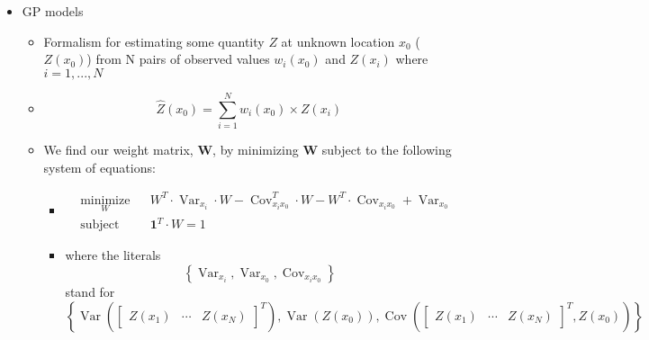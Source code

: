 \documentclass[aps,pre,nofootinbib,superscriptaddress,linenumbers,10pt, draft,tightenlines]{revtex4-1}
\begin{document}
\begin{itemize}
\begin{itemize}
\begin{itemize}
            \item GP models
            \begin{itemize}
            	\item Formalism for estimating some quantity $Z$ at
            	      unknown location $x_0$ ($Z\left(x_0\right)$) 
            	      from N pairs of observed values 
            	      $w_i\left(x_0\right)$ and $Z\left(x_i\right)$ where
            	      $i = 1,...,N$
                \item \begin{equation} \hat{Z}\left(x_0\right) =
                      \sum_{i=1}^N w_i\left(x_0\right) \times
                      Z\left(x_i\right) \end{equation}
                \item We find our weight matrix, \textbf{W}, by minimizing \textbf{W} subject 
                      to the following system of equations:
                \begin{itemize}
                	\item \begin{align}
                	&\underset{W}{\text{minimize}}& & W^T \cdot \operatorname{Var}_{x_i} \cdot W - \operatorname{Cov}_{x_ix_0}^T \cdot W - W^T \cdot \operatorname{Cov}_{x_ix_0} + \operatorname{Var}_{x_0} \\
                	&\text{subject to}
                	& &\mathbf{1}^T \cdot W = 1
                	\end{align}
                	\item where the literals \begin{equation}\left\{\operatorname{Var}_{x_i},
                          \operatorname{Var}_{x_0},                    
                          \operatorname{Cov}_{x_ix_0}\right\}\end{equation} stand for
                          \begin{equation}
                	\left\{\operatorname{Var}\left(\begin{bmatrix}Z(x_1)&\cdots&Z(x_N)\end{bmatrix}^T\right), \operatorname{Var}(Z(x_0)), \operatorname{Cov} \left(\begin{bmatrix}Z(x_1)&\cdots&Z(x_N)\end{bmatrix}^T,Z(x_0)\right)\right\}\end{equation}
                \end{itemize}

\end{itemize}
\end{itemize}
\end{itemize}
\end{itemize}
\end{document}
